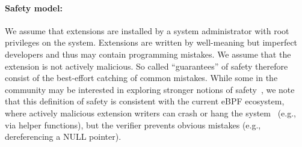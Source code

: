 \paragraph{Safety model:} We assume that extensions are installed by a system administrator with
root privileges on the system.  Extensions are written by well-meaning
but imperfect developers and thus may contain programming mistakes.
We assume that the extension is not actively malicious.  So called
``guarantees'' of safety therefore consist of the best-effort catching
of common mistakes.  While some in the community may be interested in
exploring stronger notions of safety~\cite{reconsider-unpriv-ebpf-lwn,seccomp-ebpf-lwn,ebpf-sec-lwn,jia2023},
we note that this definition of safety is consistent with the current
eBPF ecosystem, where actively malicious extension writers can crash
or hang the
system~\cite{untenableVerification,ebpf-stackoverflow,ebpf-termination}
(e.g., via helper functions), but the verifier prevents obvious
mistakes (e.g., dereferencing a NULL pointer).
